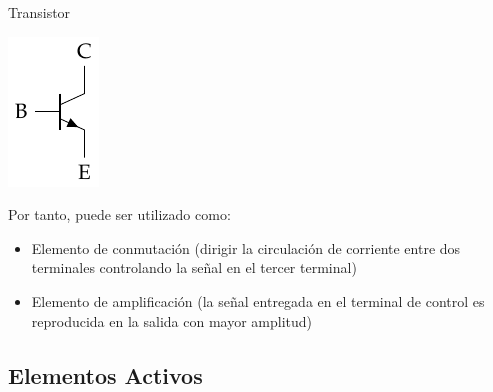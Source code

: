 \documentclass[xcolor={usenames,svgnames,dvipsnames}]{beamer}
\begin{document}
\begin{frame}[label={sec:org789321e}]{Transistor}
\begin{center}
\includegraphics[height=0.3\textheight]{figs/Transistor.pdf}
\end{center}

Por tanto, puede ser utilizado como:

\begin{itemize}
\item \alert{Elemento de conmutación} (dirigir la circulación de corriente entre
dos terminales controlando la señal en el tercer terminal)

\item \alert{Elemento de amplificación} (la señal entregada en el terminal de
control es reproducida en la salida con mayor amplitud)
\end{itemize}
\end{frame}


\subsection{Elementos Activos}
\label{sec:org2b9aaf3}
\end{document}
